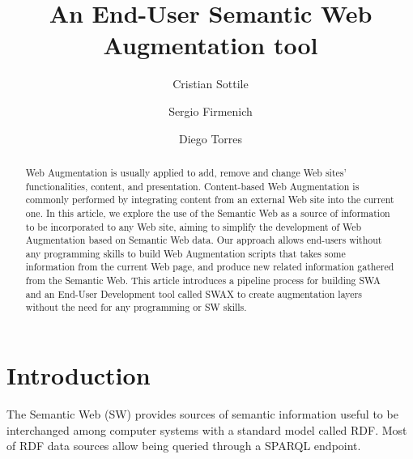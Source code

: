 \documentclass[runningheads]{llncs}
\begin{document}
%
\title{An End-User Semantic Web Augmentation tool}
%
%
\author{Cristian Sottile \and
Sergio Firmenich \and
Diego Torres}
%
%
%
\maketitle              %
%
\begin{abstract}
    Web Augmentation is usually applied to add, remove and change Web sites' functionalities, content, and presentation. Content-based Web Augmentation is commonly performed by integrating content from an external Web site into the current one. In this article, we explore the use of the Semantic Web as a source of information to be incorporated to any Web site, aiming to simplify the development of Web Augmentation based on Semantic Web data. Our approach allows end-users without any programming skills to build Web Augmentation scripts that takes some information from the current Web page, and produce new related information gathered from the Semantic Web. This article introduces a pipeline process for building SWA and an End-User Development tool called SWAX to create augmentation layers without the need for any programming or SW skills.

\end{abstract}
%
%
%

\section{Introduction}
\label{sec-introduction}

The Semantic Web \cite{Berners-Lee2001TheWeb,Shadbolt2006TheRevisited} (SW) provides sources of semantic information useful to be interchanged among computer systems with a standard model called RDF. Most of RDF data sources allow being queried through a SPARQL endpoint.
\end{document}
